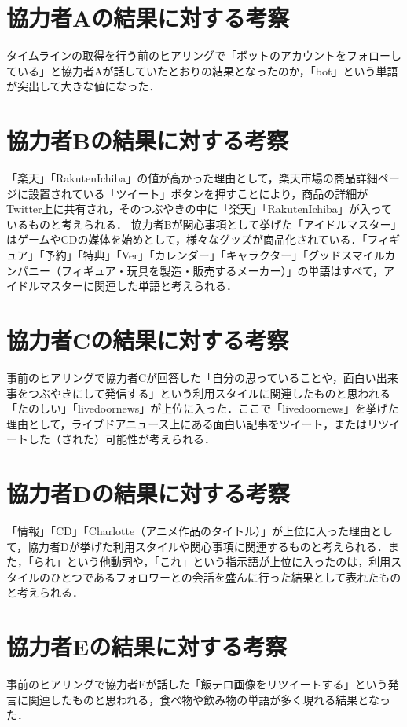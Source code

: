 \section{協力者Aの結果に対する考察}
タイムラインの取得を行う前のヒアリングで「ボットのアカウントをフォローしている」と協力者Aが話していたとおりの結果となったのか，「bot」という単語が突出して大きな値になった．

\section{協力者Bの結果に対する考察}
「楽天」「RakutenIchiba」の値が高かった理由として，楽天市場の商品詳細ページに設置されている「ツイート」ボタンを押すことにより，商品の詳細がTwitter上に共有され，そのつぶやきの中に「楽天」「RakutenIchiba」が入っているものと考えられる．
協力者Bが関心事項として挙げた「アイドルマスター」はゲームやCDの媒体を始めとして，様々なグッズが商品化されている．「フィギュア」「予約」「特典」「Ver」「カレンダー」「キャラクター」「グッドスマイルカンパニー（フィギュア・玩具を製造・販売するメーカー）」の単語はすべて，アイドルマスターに関連した単語と考えられる．

\section{協力者Cの結果に対する考察}
事前のヒアリングで協力者Cが回答した「自分の思っていることや，面白い出来事をつぶやきにして発信する」という利用スタイルに関連したものと思われる「たのしい」「livedoornews」が上位に入った．ここで「livedoornews」を挙げた理由として，ライブドアニュース上にある面白い記事をツイート，またはリツイートした（された）可能性が考えられる．

\section{協力者Dの結果に対する考察}
「情報」「CD」「Charlotte（アニメ作品のタイトル）」が上位に入った理由として，協力者Dが挙げた利用スタイルや関心事項に関連するものと考えられる．また，「られ」という他動詞や，「これ」という指示語が上位に入ったのは，利用スタイルのひとつであるフォロワーとの会話を盛んに行った結果として表れたものと考えられる．

\section{協力者Eの結果に対する考察}
事前のヒアリングで協力者Eが話した「飯テロ画像をリツイートする」という発言に関連したものと思われる，食べ物や飲み物の単語が多く現れる結果となった．

